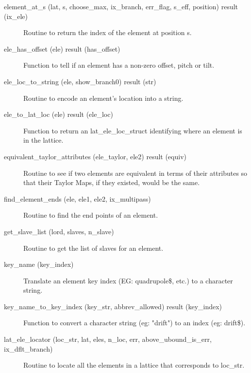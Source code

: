 \begin{description}
\label{r:element.at.s}
\item[element_at_s (lat, s, choose_max, ix_branch, err_flag, s_eff, position) result (ix_ele)] \Newline 
Routine to return the index of the element at position s.

\label{r:ele.has.offset}
\item[ele_has_offset (ele) result (has_offset)] \Newline 
Function to tell if an element has a non-zero offset, pitch or tilt.

\label{r:ele.loc.to.string}
\item[ele_loc_to_string (ele, show_branch0) result (str)] \Newline 
Routine to encode an element's location into a string.

\label{r:ele.to.lat.loc}
\item[ele_to_lat_loc (ele) result (ele_loc)] \Newline 
Function to return an lat_ele_loc_struct identifying where an element is in the lattice.

\item[equivalent_taylor_attributes (ele_taylor, ele2) result (equiv)] \Newline 
Routine to see if two elements are equivalent in terms of their attributes so
that their Taylor Maps, if they existed, would be the same.

\label{r:find.element.ends}
\item[find_element_ends (ele, ele1, ele2, ix_multipass)] \Newline
Routine to find the end points of an element. 

\label{r:get.slave.list}
\item[get_slave_list (lord, slaves, n_slave)] \Newline 
Routine to get the list of slaves for an element.

\label{r:key.name}
\item[{key_name (key_index)}] \Newline
Translate an element key index (EG: quadrupole\$, etc.) to a character string.

\label{r:key.name.to.key.index}
\item[key_name_to_key_index (key_str, abbrev_allowed) result (key_index)] \Newline 
Function to convert a character string  (eg: "drift") to an index (eg: drift\$).

\label{r:lat.ele.locator}
\item[lat_ele_locator (loc_str, lat, eles, n_loc, err, 
            above_ubound_is_err, ix_dflt_branch)] \Newline 
Routine to locate all the elements in a lattice that corresponds to loc_str. 


\end{description}
